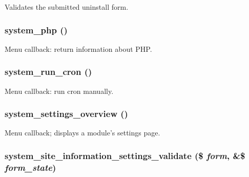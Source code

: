 Validates the submitted uninstall form. \hypertarget{system_8admin_8inc_8b63014dfdc3c9eabbaf62ff9ef456fc}{
\subsubsection[{system\_\-php}]{\setlength{\rightskip}{0pt plus 5cm}system\_\-php ()}}
\label{system_8admin_8inc_8b63014dfdc3c9eabbaf62ff9ef456fc}


Menu callback: return information about PHP. \hypertarget{system_8admin_8inc_df6e4af7e3bed308ad0dd53d1541104a}{
\subsubsection[{system\_\-run\_\-cron}]{\setlength{\rightskip}{0pt plus 5cm}system\_\-run\_\-cron ()}}
\label{system_8admin_8inc_df6e4af7e3bed308ad0dd53d1541104a}


Menu callback: run cron manually. \hypertarget{system_8admin_8inc_8f7e131c5d7173602739c67ef91093de}{
\subsubsection[{system\_\-settings\_\-overview}]{\setlength{\rightskip}{0pt plus 5cm}system\_\-settings\_\-overview ()}}
\label{system_8admin_8inc_8f7e131c5d7173602739c67ef91093de}


Menu callback; displays a module's settings page. \hypertarget{system_8admin_8inc_bf9e67e3196d40a164cfacba18613b28}{
\subsubsection[{system\_\-site\_\-information\_\-settings\_\-validate}]{\setlength{\rightskip}{0pt plus 5cm}system\_\-site\_\-information\_\-settings\_\-validate (\$ {\em form}, \/  \&\$ {\em form\_\-state})}}
\label{system_8admin_8inc_bf9e67e3196d40a164cfacba18613b28}


